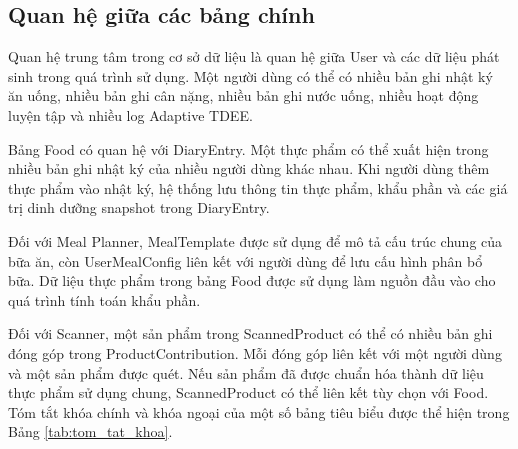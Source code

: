 \documentclass[12pt, a4paper]{report}
\begin{document}
\subsection{Quan hệ giữa các bảng chính}Quan hệ trung tâm trong cơ sở dữ liệu là quan hệ giữa User và các dữ liệu phát sinh trong quá trình sử dụng. Một người dùng có thể có nhiều bản ghi nhật ký ăn uống, nhiều bản ghi cân nặng, nhiều bản ghi nước uống, nhiều hoạt động luyện tập và nhiều log Adaptive TDEE.

Bảng Food có quan hệ với DiaryEntry. Một thực phẩm có thể xuất hiện trong nhiều bản ghi nhật ký của nhiều người dùng khác nhau. Khi người dùng thêm thực phẩm vào nhật ký, hệ thống lưu thông tin thực phẩm, khẩu phần và các giá trị dinh dưỡng snapshot trong DiaryEntry.

Đối với Meal Planner, MealTemplate được sử dụng để mô tả cấu trúc chung của bữa ăn, còn UserMealConfig liên kết với người dùng để lưu cấu hình phân bổ bữa. Dữ liệu thực phẩm trong bảng Food được sử dụng làm nguồn đầu vào cho quá trình tính toán khẩu phần.

Đối với Scanner, một sản phẩm trong ScannedProduct có thể có nhiều bản ghi đóng góp trong ProductContribution. Mỗi đóng góp liên kết với một người dùng và một sản phẩm được quét. Nếu sản phẩm đã được chuẩn hóa thành dữ liệu thực phẩm sử dụng chung, ScannedProduct có thể liên kết tùy chọn với Food. Tóm tắt khóa chính và khóa ngoại của một số bảng tiêu biểu được thể hiện trong Bảng \ref{tab:tom_tat_khoa}.
\end{document}
